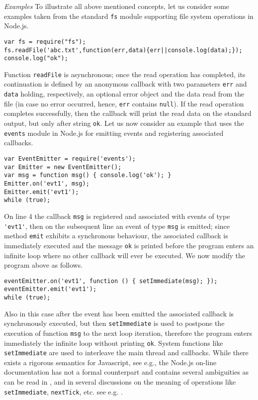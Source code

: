 {\em Examples}
To illustrate all above mentioned concepts, let us consider some examples taken from the standard \verb+fs+ module supporting file system operations in Node.js.
\begin{verbatim}
var fs = require("fs");
fs.readFile('abc.txt',function(err,data){err||console.log(data);});
console.log("ok");
\end{verbatim}
Function \verb+readFile+ is asynchronous; once the read operation has completed, its continuation is defined by an anonymous callback with two parameters \verb+err+ and \verb+data+ holding, respectively, an optional error object 
and the data read from the file (in case no error occurred, hence, \verb+err+ contains 
\verb+null+).  If the read operation completes successfully, then the callback will print the read data on the standard output, but only after string \verb+ok+.
Let us now consider an example that uses the \verb+events+ module in Node.js for emitting events and registering associated callbacks.
\begin{verbatim}
var EventEmitter = require('events');
var Emitter = new EventEmitter();
var msg = function msg() { console.log('ok'); }
Emitter.on('evt1', msg);
Emitter.emit('evt1');
while (true);
\end{verbatim}
On line 4 the callback \verb+msg+ is registered and associated with events of type \verb+'evt1'+, then  on the subsequent line an event of type \verb+msg+ is emitted; since  
method \verb+emit+ exhibits a synchronous behaviour, the associated callback is immediately executed and the message \verb+ok+ is printed before
the program enters an infinite loop where no other callback will ever be executed. 
We now modify the program above as follows.
\begin{verbatim}
eventEmitter.on('evt1', function () { setImmediate(msg); });
eventEmitter.emit('evt1');
while (true);
\end{verbatim}
Also in this case after the event has been emitted the associated callback is synchronously executed, but then
\verb+setImmediate+ is used to postpone the execution of function \verb+msg+ to the next loop iteration, therefore the program enters immediately the infinite loop without printing \verb+ok+.  System functions like \verb+setImmediate+ are used to interleave the main thread and callbacks. While there exists a rigorous semantics for Javascript, see e.g.\cite{PSR15}, the Node.js on-line documentation \cite{NodeDoc} has not a 
formal counterpart and contains several ambiguities as can be read in \cite{NodeDocELT}, and in several discussions on the meaning of operations like \verb+setImmediate+, 
\verb+nextTick+, etc. see e.g. \cite{d1,d2,d3}.

